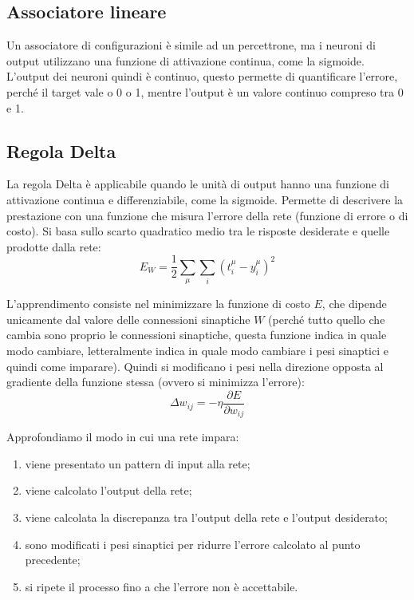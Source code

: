 \subsection{Associatore lineare}

Un associatore di configurazioni è simile ad un percettrone, ma i neuroni di
output utilizzano una funzione di attivazione continua, come la sigmoide.
L'output dei neuroni quindi è continuo, questo permette di quantificare
l'errore, perché il target vale o 0 o 1, mentre l'output è un valore continuo
compreso tra 0 e 1.

\subsection{Regola Delta}

La regola Delta è applicabile quando le unità di output hanno una funzione di
attivazione continua e differenziabile, come la sigmoide. Permette di descrivere
la prestazione con una funzione che misura l'errore della rete (funzione di
errore o di costo). Si basa sullo scarto quadratico medio tra le risposte
desiderate e quelle prodotte dalla rete:
\begin{equation*}
	E_W = \frac{1}{2} \sum_{\mu} \sum_{i} (t_i^\mu - y_i^\mu)^2
\end{equation*}

L'apprendimento consiste nel minimizzare la funzione di costo $E$, che dipende
unicamente dal valore delle connessioni sinaptiche $W$ (perché tutto quello che
cambia sono proprio le connessioni sinaptiche, questa funzione indica in quale
modo cambiare, letteralmente indica in quale modo cambiare i pesi sinaptici e
quindi come imparare). Quindi si modificano i pesi nella direzione opposta al
gradiente della funzione stessa (ovvero si minimizza l'errore):
\begin{equation*}
	\Delta w_{ij} = - \eta \frac{\partial E}{\partial w_{ij}}
\end{equation*}

Approfondiamo il modo in cui una rete impara:
\begin{enumerate}
	\item viene presentato un pattern di input alla rete;
	\item viene calcolato l'output della rete;
	\item viene calcolata la discrepanza tra l'output della rete e l'output
		desiderato;
	\item sono modificati i pesi sinaptici per ridurre l'errore calcolato al 
		punto precedente;
	\item si ripete il processo fino a che l'errore non è accettabile.
\end{enumerate}

